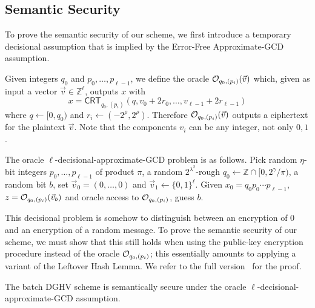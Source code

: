 \documentclass{llncs}
\newcommand{\Z}{{\mathbb Z}}
\newcommand*{\crt}{\ensuremath{\mathsf{CRT}}}
\begin{document}
\subsection{Semantic Security}\label{sec:semantic-security}

To prove the semantic security of our scheme, 
we first introduce a temporary decisional assumption that is implied by the 
Error-Free Approximate-GCD assumption. 

Given integers $q_0$ and $p_0,\ldots,p_{\ell-1}$, we define the oracle
${\cal O}_{q_0,(p_i)}(\vec{v})$ which, given as input a vector $\vec{v} \in {\mathbb
  Z}^\ell$, outputs $x$ with
$$ x = \crt_{q_0,(p_i)}(q,v_0+2r_0,\ldots,v_{\ell-1}+2r_{\ell-1})$$
where $q \leftarrow [0,q_0)$ and $r_i \leftarrow
    (-2^\rho,2^\rho)$. Therefore ${\cal O}_{q_0,(p_i)}(\vec{v})$
    outputs a ciphertext for the plaintext $\vec{v}$. Note that the
    components $v_i$ can be any integer, not only $0,1$.

\begin{definition} The
  oracle $\ell$-decisional-approximate-GCD problem is as
  follows. Pick random $\eta$-bit 
  integers $p_0,\ldots,p_{\ell-1}$ of product $\pi$, a random
  $2^{\lambda^2}$-rough $q_0 \leftarrow \Z \cap  
  [0,2^{\gamma}/\pi)$, a random bit $b$, set $\vec{v}_0=
  (0,\ldots,0)$
and $\vec{v}_1\leftarrow
  \{0,1\}^\ell$. Given  $x_0=q_0p_0\cdots p_{\ell-1}$, $z={\cal O}_{q_0,(p_i)}(\vec{v}_b)$ and oracle access to ${\cal
    O}_{q_0,(p_i)}$, guess $b$.
\end{definition}
 
This decisional
problem is somehow to distinguish between an encryption of $0$ and
an encryption of a random message. To prove the semantic security 
of our scheme, we must show that this  still holds when using the public-key
encryption procedure instead of the oracle ${\cal 
    O}_{q_0,(p_i)}$; this essentially amounts to applying a variant
                    of the Leftover Hash Lemma. We refer to the full
                    version~\cite{CLT2013a} for the proof.

\begin{theorem}\label{thm:l-dAGC}
The batch DGHV scheme is semantically secure under the
oracle $\ell$-decisional-approximate-GCD assumption.
\end{theorem}
\end{document}
